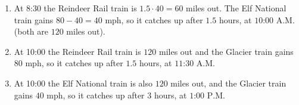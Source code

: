 \begin{enumerate}
\item[(a)] At 8:30 the Reindeer Rail train is $1.5\cdot40=60$ miles out. The Elf National train gains $80-40=40$ mph, so it catches up after $1.5$ hours, at $\boxed{\text{10:00 A.M.}}$ (both are $120$ miles out).
\item[(b)] At 10:00 the Reindeer Rail train is $120$ miles out and the Glacier train gains $80$ mph, so it catches up after $1.5$ hours, at $\boxed{\text{11:30 A.M.}}$
\item[(c)] At 10:00 the Elf National train is also $120$ miles out, and the Glacier train gains $40$ mph, so it catches up after $3$ hours, at $\boxed{\text{1:00 P.M.}}$
\end{enumerate}
